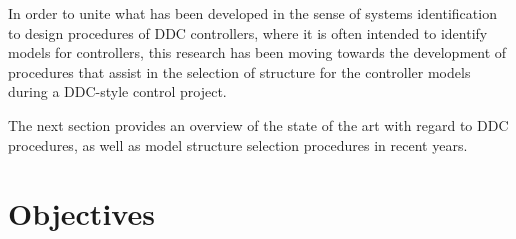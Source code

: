 In order to unite what has been developed in the sense of systems identification to design procedures of DDC controllers, where it is often intended to identify models for controllers, this research has been moving towards the development of procedures that assist in the selection of structure for the controller models during a DDC-style control project.

The next section provides an overview of the state of the art with regard to DDC procedures, as well as model structure selection procedures in recent years.

\section{Objectives}%
\label{sec:objectives}


